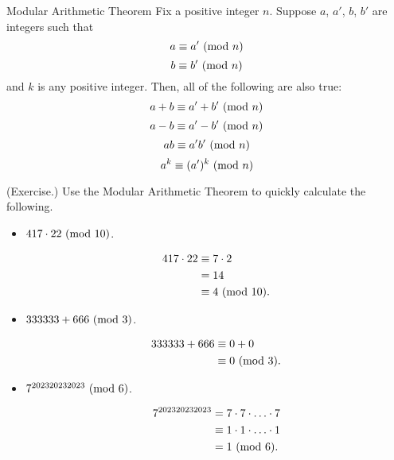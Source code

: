 \documentclass[letterpaper]{article}
\begin{document}
\begin{theorem}{Modular Arithmetic Theorem}{}
    Fix a positive integer $n$. Suppose $a$, $a'$, $b$, $b'$ are integers such that 
    \[a \equiv a' \ (\mathrm{mod}\ n)\]
    \[b \equiv b' \ (\mathrm{mod}\ n)\]
    and $k$ is any positive integer. Then, all of the following are also true: 
    \[a + b \equiv a' + b' \ (\mathrm{mod}\ n)\]
    \[a - b \equiv a' - b' \ (\mathrm{mod}\ n)\]
    \[ab \equiv a'b' \ (\mathrm{mod}\ n)\]
    \[a^k \equiv (a')^k \ (\mathrm{mod}\ n)\]
\end{theorem}

\begin{mdframed}
    (Exercise.) Use the Modular Arithmetic Theorem to quickly calculate the following. 
    \begin{itemize}
        \item $417 \cdot 22 \ (\mathrm{mod}\ 10)$.
        \begin{mdframed}
            \begin{equation*}
                \begin{aligned}
                    417 \cdot 22 &\equiv 7 \cdot 2  \\ 
                        &= 14 \\ 
                        &\equiv 4 \ (\mathrm{mod}\ 10).
                \end{aligned}
            \end{equation*}
        \end{mdframed}
        \item $333333 + 666 \ (\mathrm{mod}\ 3)$.
        \begin{mdframed}
            \begin{equation*}
                \begin{aligned}
                    333333 + 666 &\equiv 0 + 0 \\ 
                        &\equiv 0 \ (\mathrm{mod}\ 3).
                \end{aligned}
            \end{equation*}
        \end{mdframed}
        \item $7^{202320232023} \ (\mathrm{mod}\ 6)$. 
        \begin{mdframed}
            \begin{equation*}
                \begin{aligned}
                    7^{202320232023} &= 7 \cdot 7 \cdot \hdots \cdot 7 \\ 
                        &\equiv 1 \cdot 1 \cdot \hdots \cdot 1 \\ 
                        &= 1 \Mod{6}.

\end{aligned}
\end{equation*}
\end{mdframed}
\end{itemize}
\end{mdframed}
\end{document}
